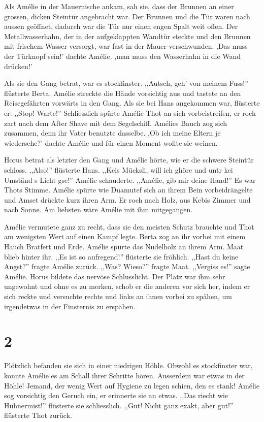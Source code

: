 \documentclass[11pt,titlepage,a5paper]{book}
\begin{document}
Als Amélie in der Mauernische ankam, sah sie, dass der Brunnen an einer grossen, dicken Steintür angebracht war. Der Brunnen und die Tür waren nach aussen geöffnet, dadurch war die Tür nur einen engen  Spalt weit offen. Der Metallwasserhahn, der in der aufgeklappten Wandtür steckte und den Brunnen mit frischem Wasser versorgt, war fast in der Mauer verschwunden. ,Das muss der Türknopf sein!' dachte Amélie. ,man muss den Wasserhahn in die Wand drücken!' 

Als sie den Gang betrat, war es stockfinster. ,,Autsch, geh' von meinem Fuss!'' flüsterte Berta. Amélie streckte die Hände vorsichtig aus und tastete an den Reisegefährten vorwärts in den Gang. Als sie bei Hans angekommen war, flüsterte er: ,,Stop! Warte!'' Schliesslich spürte Amélie Thot an sich vorbeistreifen, er roch zart nach dem After Shave mit dem Segelschiff. Amélies Bauch zog sich zusammen, denn ihr Vater benutzte dasselbe. ,Ob ich meine Eltern je wiedersehe?' dachte Amélie und für einen Moment wollte sie weinen. 

Horus betrat als letzter den Gang und Amélie hörte, wie er die schwere Steintür schloss. ,,Also!'' flüsterte Hans. ,,Keis Mücksli, will ich ghöre und untr kei Umständ s Licht gse!'' Amélie schauderte. ,,Amélie, gib mir deine Hand!'' Es war Thots Stimme. Amélie spürte wie Duamutef sich an ihrem Bein vorbeidrängelte und Amset drückte kurz ihren Arm. Er roch nach Holz, aus Kebis Zimmer und nach Sonne. Am liebsten wäre Amélie mit ihm mitgegangen.

Amélie vermutete ganz zu recht, dass sie den meisten Schutz brauchte und Thot am wenigsten Wert auf einen Kampf legte. Berta zog an ihr vorbei mit einem Hauch Bratfett und Erde. Amélie spürte das Nudelholz an ihrem Arm. Maat blieb hinter ihr. ,,Es ist so aufregend!'' flüsterte sie fröhlich. ,,Hast du keine Angst?'' fragte Amélie zurück. ,,Was? Wieso?'' fragte Maat.  ,,Vergiss es!'' sagte Amélie. Horus bildete das nervöse Schlusslicht. Der Platz war ihm sehr ungewohnt und ohne es zu merken, schob er die anderen vor sich her, indem er sich reckte und versuchte rechts und links an ihnen vorbei zu spähen, um irgendetwas in der Finsternis zu erspähen.

 \section*{2}

Plötzlich befanden sie sich in einer niedrigen Höhle. Obwohl es stockfinster war, konnte Amélie es am Schall ihrer Schritte hören. Ausserdem war etwas in der Höhle! Jemand, der wenig Wert auf Hygiene zu legen schien, den es stank! Amélie sog vorsichtig den Geruch ein, er erinnerte sie an etwas. ,,Das riecht wie Hühnermist!'' flüsterte sie schliesslich. ,,Gut! Nicht ganz exakt, aber gut!'' flüsterte Thot zurück.
\end{document}
